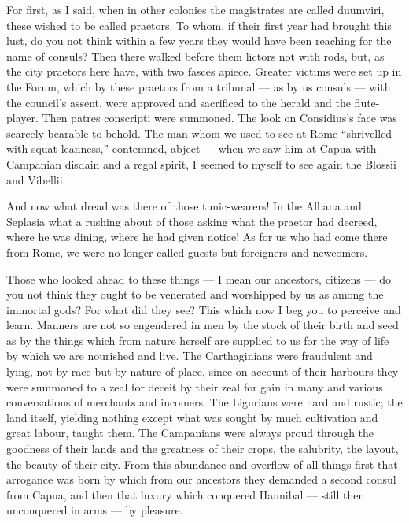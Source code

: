  For first, as I said, when in other colonies the magistrates are called duumviri, these wished to be called praetors. To whom, if their first year had brought this lust, do you not think within a few years they would have been reaching for the name of consuls? Then there walked before them lictors not with rods, but, as the city praetors here have, with two fasces apiece. Greater victims were set up in the Forum, which by these praetors from a tribunal --- as by us consuls --- with the council's assent, were approved and sacrificed to the herald and the flute-player. Then patres conscripti were summoned. The look on Considius's face was scarcely bearable to behold. The man whom we used to see at Rome ``shrivelled with squat leanness,'' contemned, abject --- when we saw him at Capua with Campanian disdain and a regal spirit, I seemed to myself to see again the Blossii and Vibellii.

 And now what dread was there of those tunic-wearers! In the Albana and Seplasia what a rushing about of those asking what the praetor had decreed, where he was dining, where he had given notice! As for us who had come there from Rome, we were no longer called guests but foreigners and newcomers.

 Those who looked ahead to these things --- I mean our ancestors, citizens --- do you not think they ought to be venerated and worshipped by us as among the immortal gods? For what did they see? This which now I beg you to perceive and learn. Manners are not so engendered in men by the stock of their birth and seed as by the things which from nature herself are supplied to us for the way of life by which we are nourished and live. The Carthaginians were fraudulent and lying, not by race but by nature of place, since on account of their harbours they were summoned to a zeal for deceit by their zeal for gain in many and various conversations of merchants and incomers. The Ligurians were hard and rustic; the land itself, yielding nothing except what was sought by much cultivation and great labour, taught them. The Campanians were always proud through the goodness of their lands and the greatness of their crops, the salubrity, the layout, the beauty of their city. From this abundance and overflow of all things first that arrogance was born by which from our ancestors they demanded a second consul from Capua, and then that luxury which conquered Hannibal --- still then unconquered in arms --- by pleasure.

